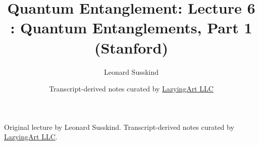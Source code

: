 \documentclass[11pt,oneside]{book}
\begin{document}
\frontmatter
\title{Quantum Entanglement: Lecture 6 : Quantum Entanglements, Part 1 (Stanford)}
\author{Leonard Susskind}
\date{Transcript-derived notes curated by \href{https://lazying.art}{LazyingArt LLC}}
\maketitle
\begin{center}
\small Original lecture by Leonard Susskind. Transcript-derived notes curated by \href{https://lazying.art}{LazyingArt LLC}.
\end{center}
\clearpage
\mainmatter

\end{document}
